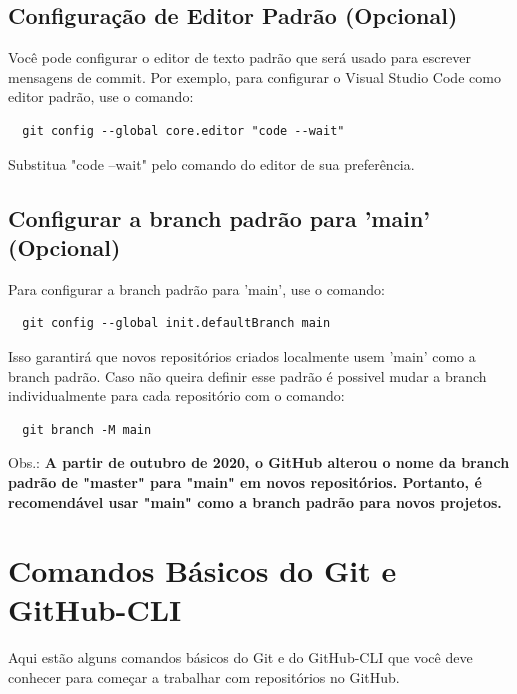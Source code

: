 \subsection{Configuração de Editor Padrão (Opcional)}
Você pode configurar o editor de texto padrão que será usado para escrever mensagens de commit. Por exemplo, para configurar o Visual Studio Code como editor padrão, use o comando:
\begin{verbatim}
  git config --global core.editor "code --wait"
\end{verbatim}
Substitua "code --wait" pelo comando do editor de sua preferência.
\par
\subsection{Configurar a branch padrão para 'main' (Opcional)}
Para configurar a branch padrão para 'main', use o comando:
\begin{verbatim}
  git config --global init.defaultBranch main
\end{verbatim}
Isso garantirá que novos repositórios criados localmente usem 'main' como a branch padrão. Caso não queira definir esse padrão é possivel mudar a branch individualmente para cada repositório com o comando:
\begin{verbatim}
  git branch -M main
\end{verbatim}
\par
Obs.: \textbf{A partir de outubro de 2020, o GitHub alterou o nome da branch padrão de "master" para "main" em novos repositórios. Portanto, é recomendável usar "main" como a branch padrão para novos projetos.}
\par
\section{Comandos Básicos do Git e GitHub-CLI}
Aqui estão alguns comandos básicos do Git e do GitHub-CLI que você deve conhecer para começar a trabalhar com repositórios no GitHub.
\par
